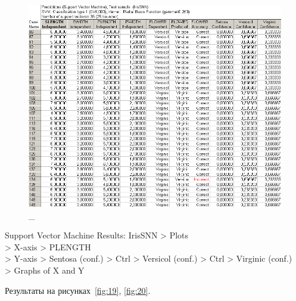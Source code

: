 \begin{figure}[!hp]
  \centering

  \includegraphics[width=14cm]
  {inc/ex_18.PNG}

  \caption{\_}

  \label{fig:18}
\end{figure}

\newpage

Support Vector Machine Results: IrisSNN > Plots \\
> X-axis > PLENGTH \\
> Y-axis > Sentosa (conf.) > Ctrl > Versicol (conf.) > Ctrl > Virginic (conf.) \\
> Graphs of X and Y

Результаты на рисунках~\ref{fig:19}, \ref{fig:20}.

